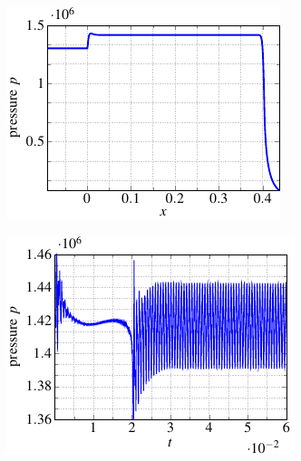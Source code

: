 \begin{figure}
  \centering
  \begin{subfigure}[]{0.48\linewidth}
          \includegraphics[scale=1]{Figures/paper-figure25.pdf}
  \caption{} \label{fig:5p2.2a}
  \label{steady_state}
  \end{subfigure}\hfill%
  \begin{subfigure}[]{0.48\linewidth}
        \includegraphics[scale=1]{Figures/paper-figure26.pdf}

\end{subfigure}
\end{figure}
